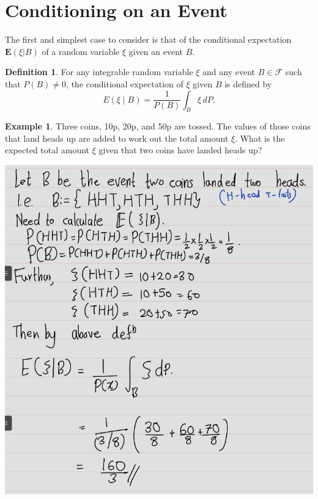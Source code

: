 \documentclass[
]{book}
\theoremstyle{definition}
\newtheorem{definition}{Definition}[chapter]
\theoremstyle{definition}
\newtheorem{example}{Example}[chapter]
\theoremstyle{definition}
\theoremstyle{definition}
\theoremstyle{remark}
\begin{document}
\section{Conditioning on an Event}\label{conditioning-on-an-event}

The first and simplest case to consider is that of the conditional expectation
\(\mathbf{E} (\xi|B)\) of a random variable \(\xi\) given an event \(B\).

\begin{definition}
\protect\hypertarget{def:unnamed-chunk-42}{}\label{def:unnamed-chunk-42}For any integrable random variable \(\xi\) and any event \(B \in \mathcal{F}\) such that \(P(B) \neq 0\), the conditional expectation of \(\xi\) given \(B\) is defined by
\[
E(\xi \mid B) = \frac{1}{P(B)} \int_B \xi \, dP.
\]
\end{definition}

\begin{example}
\protect\hypertarget{exm:eg21}{}\label{exm:eg21}Three coins, 10p, 20p, and 50p are tossed. The values of those coins that land heads up are added to work out the total amount \(\xi\). What is the expected total amount \(\xi\) given that two coins have landed heads up?
\end{example}

\includegraphics[width=18cm,height=\textheight]{fig/fig eg2.1.png}
\end{document}
